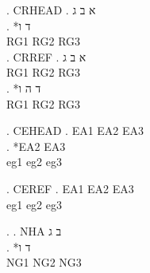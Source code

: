 

\ex. CRHEAD
\ag. א ב ג \\
\bg. *ד {} ו\\
\CommonGloss RG1 RG2 RG3\\

\ex. CRREF
\ag. א ב ג \\
RG1 RG2 RG3\\
\bg. *ד ה ו\\
RG1 RG2 RG3\\

\begin{english}
\ex. CEHEAD
\ag. EA1 EA2 EA3 \\
\bg. *EA2 {} EA3\\
\CommonGloss eg1 eg2 eg3\\
\end{english}

\begin{english}
\ex. CEREF
\ag. EA1 EA2 EA3\\
eg1 eg2 eg3\\
\end{english}

\ex.
\ag. NHA ב ג\\
\bg. *ד {} ו\\
\CommonGloss NG1 NG2 NG3\\

